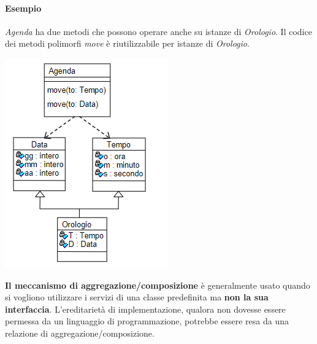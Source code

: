 \documentclass{article}
\begin{document}
	\paragraph*{Esempio}
	\textit{Agenda} ha due metodi che possono operare anche su istanze di \textit{Orologio}. Il codice dei metodi polimorfi \textit{move} è riutilizzabile per istanze di \textit{Orologio}.
	\begin{center}
		\includegraphics[scale=0.5]{assets/ereditarieta_vs_aggregazione.png}
	\end{center}
	\textbf{Il meccanismo di aggregazione/composizione} è generalmente usato quando si vogliono utilizzare i servizi di una classe predefinita ma \textbf{non la sua interfaccia}. L'ereditarietà di implementazione, qualora non dovesse essere permessa da un linguaggio di programmazione, potrebbe essere resa da una relazione di aggregazione/composizione.
\end{document}
